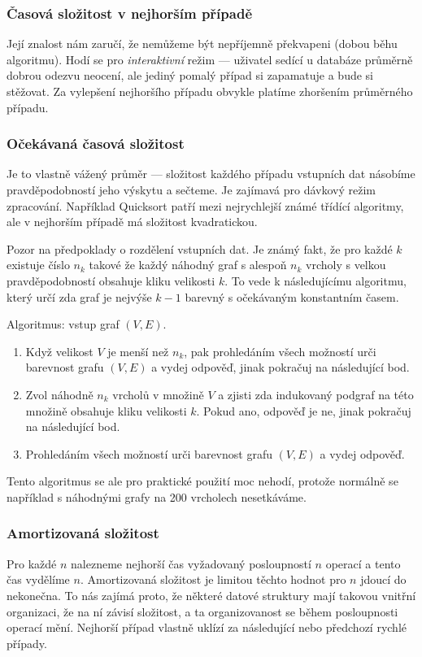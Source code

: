 \subsubsection{Časová složitost v nejhorším případě}
Její znalost nám zaručí, že nemůžeme být nepříjemně překvapeni (dobou
běhu algoritmu). Hodí se pro {\em interaktivní} režim --- uživatel
sedící u databáze průměrně dobrou odezvu neocení, ale jediný pomalý
případ si zapamatuje a bude si stěžovat. Za vylepšení nejhoršího
případu obvykle platíme zhoršením průměrného případu.

\subsubsection{Očekávaná časová složitost}
Je to vlastně vážený průměr --- složitost každého případu vstupních
dat násobíme pravděpodobností jeho výskytu a sečteme. Je zajímavá pro
dávkový režim zpracování. Například Quicksort patří mezi nejrychlejší známé
třídící algoritmy, ale v nejhorším případě má složitost kvadratickou.

Pozor na předpoklady o rozdělení vstupních dat. Je známý fakt, že pro každé 
$k$ existuje číslo $n_k$ takové že každý náhodný graf s alespoň $n_k$ vrcholy
s velkou pravděpodobností obsahuje kliku velikosti $k$. To vede k 
následujícímu algoritmu, který určí zda graf je nejvýše $k-1$ barevný s 
očekávaným konstantním časem.

Algoritmus: vstup graf $(V,E)$.
\begin{enumerate}
\item
Když velikost $V$ je menší než $n_k$, pak prohledáním všech možností 
urči barevnost grafu $(V,E)$ a vydej odpověď, jinak pokračuj na následující 
bod.
\item
Zvol náhodně $n_k$ vrcholů v množině $V$ a zjisti zda indukovaný podgraf 
na této množině obsahuje kliku velikosti $k$. Pokud ano, odpověď je ne, 
jinak pokračuj na následující bod.
\item
Prohledáním všech možností urči barevnost grafu $(V,E)$ a vydej odpověď.
\end{enumerate}


Tento algoritmus se ale pro praktické použití moc nehodí, protože normálně 
se například s náhodnými grafy na 200 vrcholech nesetkáváme.

\subsubsection{Amortizovaná složitost}
Pro každé $n$ nalezneme nejhorší čas vyžadovaný posloupností $n$ 
operací a tento čas vydělíme $n$. Amortizovaná složitost je limitou 
těchto hodnot pro $n$ jdoucí do nekonečna. To nás zajímá proto, že některé
datové struktury mají takovou vnitřní organizaci, že na ní závisí
složitost, a ta organizovanost se během posloupnosti operací
mění. Nejhorší případ vlastně uklízí za následující nebo
předchozí rychlé případy.

